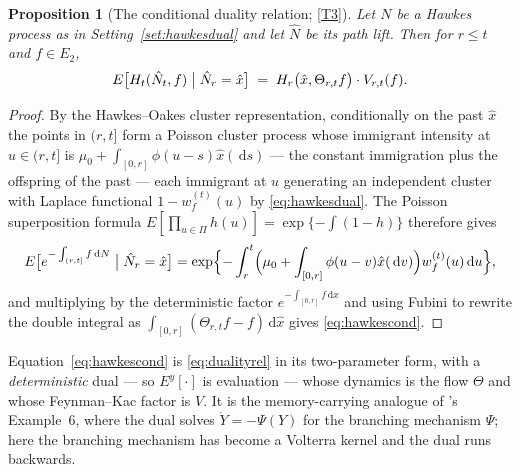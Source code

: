 \documentclass[11pt,a4paper]{article}
\theoremstyle{plain}
\newtheorem{proposition}[theorem]{Proposition}
\theoremstyle{definition}
\theoremstyle{remark}
\newcommand{\DGP}{\cite{DGP24}}
\newcommand{\dif}{\,\mathrm{d}}
\begin{document}
\begin{proposition}[The conditional duality relation; \eqref{T3}]
  \label{prop:hawkesduality}
  Let $N$ be a Hawkes process as in Setting~\ref{set:hawkesdual} and let
  $\hat{N}$ be its path lift.  Then for $r \leq t$ and $f \in E_2$,
  \begin{equation}
    \label{eq:hawkescond}
    E\bigl[ H_t(\hat{N}_t, f) \bigm| \hat{N}_r = \hat{x} \bigr]
      \;=\; H_r\bigl( \hat{x}, \Theta_{r,t}f \bigr) \cdot V_{r,t}(f) .
  \end{equation}
\end{proposition}

\begin{proof}
  By the Hawkes--Oakes cluster representation, conditionally on the past
  $\hat{x}$ the points in $(r,t]$ form a Poisson cluster process whose immigrant
  intensity at $u \in (r,t]$ is
  $\mu_0 + \int_{[0,r]} \phi(u-s)\hat{x}(\dif s)$ --- the constant immigration
  plus the offspring of the past --- each immigrant at $u$ generating an
  independent cluster with Laplace functional $1 - w^{(t)}_f(u)$ by
  \eqref{eq:hawkesdual}.  The Poisson superposition formula
  $E[\prod_{u \in \Pi}h(u)] = \exp\{-\int(1-h)\}$ therefore gives
  \[
    E\bigl[ e^{-\int_{(r,t]} f \dif N} \bigm| \hat{N}_r = \hat{x} \bigr]
      = \exp\Bigl\{ -\int_r^t
          \Bigl( \mu_0 + \int_{[0,r]}\phi(u-v)\hat{x}(\dif v) \Bigr)
          w^{(t)}_f(u) \dif u \Bigr\} ,
  \]
  and multiplying by the deterministic factor
  $e^{-\int_{[0,r]}f\dif\hat{x}}$ and using Fubini to rewrite the double integral
  as $\int_{[0,r]}(\Theta_{r,t}f - f)\dif\hat{x}$ gives \eqref{eq:hawkescond}.
\end{proof}

Equation~\eqref{eq:hawkescond} is \eqref{eq:dualityrel} in its two-parameter form,
with a \emph{deterministic} dual --- so $E^y[\cdot]$ is evaluation --- whose
dynamics is the flow $\Theta$ and whose Feynman--Kac factor is $V$.  It is the
memory-carrying analogue of \DGP's Example~6, where the dual solves
$\dot{Y} = -\Psi(Y)$ for the branching mechanism $\Psi$; here the branching
mechanism has become a Volterra kernel and the dual runs backwards.
\end{document}
